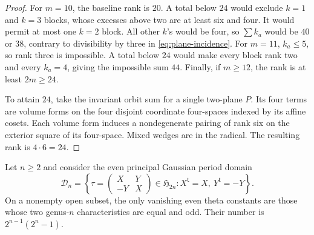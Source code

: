 \begin{proof}
For $m=10$, the baseline rank is $20$. A total below $24$ would exclude $k=1$ and $k=3$ blocks, whose excesses above two are at least six and four. It would permit at most one $k=2$ block. All other $k$'s would be four, so $\sum k_a$ would be $40$ or $38$, contrary to divisibility by three in \eqref{eq:plane-incidence}. For $m=11$, $k_a\le5$, so rank three is impossible. A total below $24$ would make every block rank two and every $k_a=4$, giving the impossible sum $44$. Finally, if $m\ge12$, the rank is at least $2m\ge24$.

To attain $24$, take the invariant orbit sum for a single two-plane $P$. Its four terms are volume forms on the four disjoint coordinate four-spaces indexed by its affine cosets. Each volume form induces a nondegenerate pairing of rank six on the exterior square of its four-space. Mixed wedges are in the radical. The resulting rank is $4\cdot6=24$.
\end{proof}

\begin{lemma}\label{lem:generic-gaussian-theta-nulls}
Let $n\ge2$ and consider the even principal Gaussian period domain
\[
 \mathcal D_n=
 \left\{\tau=
 \begin{pmatrix}X&Y\\-Y&X\end{pmatrix}\in\mathfrak H_{2n}:
 X^{\mathsf t}=X,\ Y^{\mathsf t}=-Y\right\}.
\]
On a nonempty open subset, the only vanishing even theta constants
are those whose two genus-$n$ characteristics are equal and odd.
Their number is $2^{n-1}(2^n-1)$.
\end{lemma}

